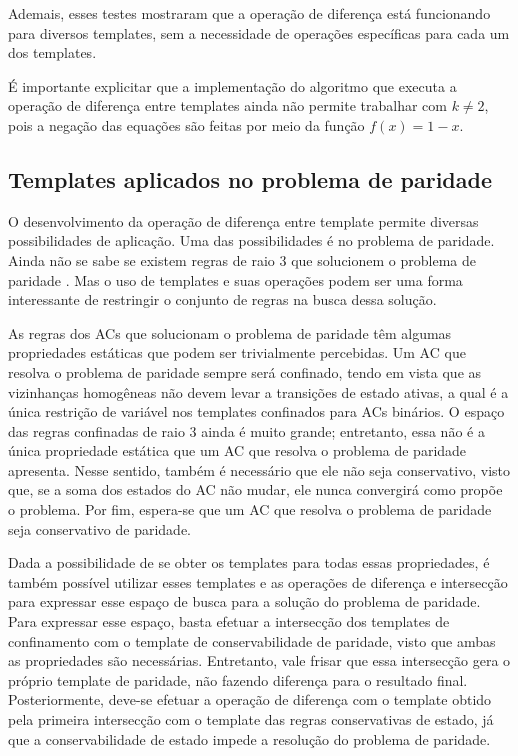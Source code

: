 Ademais, esses testes mostraram que a operação de diferença está funcionando para diversos templates, sem a necessidade de operações específicas para cada um dos templates.

É importante explicitar que a implementação do algoritmo que executa a operação de diferença entre templates ainda não permite trabalhar com $k\neq 2$, pois a negação das equações são feitas por meio da função $f(x) = 1 - x$.

\subsection{Templates aplicados no problema de paridade}
O desenvolvimento da operação de diferença entre template permite diversas possibilidades de aplicação.
Uma das possibilidades é no problema de paridade. 
Ainda não se sabe se existem regras de raio 3 que solucionem o problema de paridade \cite{Betel2013}. 
Mas o uso de templates e suas operações podem ser uma forma interessante de restringir o conjunto de regras na busca dessa solução.

As regras dos ACs que solucionam o problema de paridade têm algumas propriedades estáticas que podem ser trivialmente percebidas. 
Um AC que resolva o problema de paridade sempre será confinado, tendo em vista que as vizinhanças homogêneas não devem levar a transições de estado ativas, a qual é a única restrição de variável nos templates confinados para ACs binários. 
O espaço das regras confinadas de raio 3 ainda é muito grande; entretanto, essa não é a única propriedade estática que um AC que resolva o problema de paridade apresenta.  Nesse sentido, também é necessário que ele não seja conservativo, visto que, se a soma dos estados do AC não mudar, ele nunca convergirá como propõe o problema. 
Por fim, espera-se que um AC que resolva o problema de paridade seja conservativo de paridade.

Dada a possibilidade de se obter os templates para todas essas propriedades, é também possível utilizar esses templates e as operações de diferença e intersecção para expressar esse espaço de busca para a solução do problema de paridade.
Para expressar esse espaço, basta efetuar a intersecção dos templates de confinamento com o template de conservabilidade de paridade, visto que ambas as propriedades são necessárias. Entretanto, vale frisar que essa intersecção gera o próprio template de paridade, não fazendo diferença para o resultado final.
Posteriormente, deve-se efetuar a operação de diferença com o template obtido pela primeira intersecção com o template das regras conservativas de estado, já que a conservabilidade de estado impede a resolução do problema de paridade.

